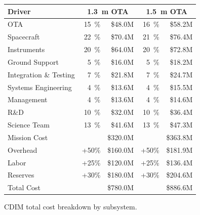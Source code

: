 \documentclass{ws-jai}
\begin{document}
\begin{wstable}[!htp]
  \centering
  \begin{tabular}{@{}lrrrr@{}}\toprule
    Driver        & \multicolumn{2}{c}{\SI{1.3}{\meter} OTA} & \multicolumn{2}{c}{\SI{1.5}{\meter} OTA} \\ \midrule
    OTA           & \SI{15}{\percent}     & \$48.0M      & \SI{16}{\percent}      & \$58.2M      \\
    Spacecraft    & \SI{22}{\percent}     & \$70.4M      & \SI{21}{\percent}      & \$76.4M      \\
    Instruments   & \SI{20}{\percent}     & \$64.0M      & \SI{20}{\percent}      & \$72.8M      \\
    Ground Support& \SI{5}{\percent}      & \$16.0M      & \SI{5}{\percent}       & \$18.2M      \\
    Integration \& Testing & \SI{7}{\percent}      & \$21.8M      & \SI{7}{\percent}      & \$24.7M      \\
    Systems Engineering    & \SI{4}{\percent}      & \$13.6M      & \SI{4}{\percent}      & \$15.5M      \\
    Management    & \SI{4}{\percent}      & \$13.6M      & \SI{4}{\percent}       & \$14.6M      \\
    R\&D          & \SI{10}{\percent}     & \$32.0M      & \SI{10}{\percent}      & \$36.4M      \\
    Science Team  & \SI{13}{\percent}     & \$41.6M      & \SI{13}{\percent}      & \$47.3M      \\ \midrule
    Mission Cost  &                       & \$320.0M     &                        & \$363.8M     \\
    Overhead      & +50\%                 & \$160.0M     & +50\%                  & \$181.9M     \\
    Labor         & +25\%                 & \$120.0M     & +25\%                  & \$136.4M     \\
    Reserves      & +30\%                 & \$180.0M     & +30\%                  & \$204.6M     \\
    Total Cost    &                       & \$780.0M     &                        & \$886.6M     \\ \bottomrule
  \end{tabular}
  \caption{CDIM total cost breakdown by subsystem.
\label{tab:total-cost}
}
\end{wstable}

\clearpage
\end{document}
